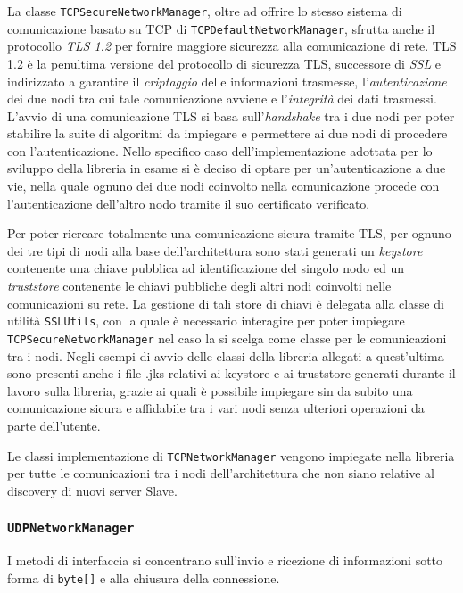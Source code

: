 La classe \texttt{TCPSecureNetworkManager}, oltre ad offrire lo stesso sistema di comunicazione basato su TCP di \texttt{TCPDefaultNetworkManager}, sfrutta anche il protocollo
\emph{TLS 1.2} per fornire maggiore sicurezza alla comunicazione di rete. 
TLS 1.2 è la penultima versione del protocollo di sicurezza TLS, successore di \emph{SSL} e indirizzato a garantire il \emph{criptaggio} delle informazioni trasmesse,
l'\emph{autenticazione} dei due nodi tra cui tale comunicazione avviene e l'\emph{integrità} dei dati trasmessi.
L'avvio di una comunicazione TLS si basa sull'\emph{handshake} tra i due nodi per poter stabilire la suite di algoritmi da impiegare e permettere ai due nodi di procedere con l'autenticazione.
Nello specifico caso dell'implementazione adottata per lo sviluppo della libreria in esame si è deciso di optare per un'autenticazione a due vie, nella quale ognuno dei due nodi coinvolto nella comunicazione
procede con l'autenticazione dell'altro nodo tramite il suo certificato verificato.

Per poter ricreare totalmente una comunicazione sicura tramite TLS, per ognuno dei tre tipi di nodi alla base dell'architettura sono stati generati un \emph{keystore} contenente una chiave pubblica ad identificazione del singolo nodo ed un \emph{truststore} contenente le chiavi pubbliche degli altri nodi coinvolti nelle comunicazioni su rete.
La gestione di tali store di chiavi è delegata alla classe di utilità \texttt{SSLUtils}, con la quale è necessario interagire per poter impiegare \texttt{TCPSecureNetworkManager} nel caso la si scelga come classe per le comunicazioni tra i nodi.
Negli esempi di avvio delle classi della libreria allegati a quest'ultima sono presenti anche i file .jks relativi ai keystore e ai truststore generati durante il lavoro sulla libreria, grazie ai quali è possibile impiegare sin da subito una comunicazione sicura e affidabile tra i vari nodi senza ulteriori operazioni da parte dell'utente.

Le classi implementazione di \texttt{TCPNetworkManager} vengono impiegate nella libreria per tutte le comunicazioni tra i nodi dell'architettura che non siano relative al discovery di nuovi server Slave.

\subsubsection{\texttt{UDPNetworkManager}}
I metodi di interfaccia si concentrano sull'invio e ricezione di informazioni sotto forma di \texttt{byte[]} e
alla chiusura della connessione. 

